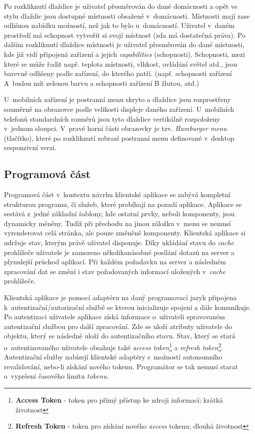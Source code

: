 Po rozkliknutí dlaždice je uživatel přesměrován do dané domácnosti a opět ve stylu dlaždic jsou dostupné místnosti obsažené v~domácnosti.
Místnosti mají zase odlišnou nabídku možností, než jak to bylo u~domácností.
Uživatel v~daném prostředí má schopnost vytvořit si svojí místnost (zda má dostatečná práva).
Po dalším rozkliknutí dlaždice místnosti je uživatel přesměrován do dané místnosti, kde již vidí připojená zařízení a jejich \emph{capabilities} (schopnosti).
Schopnosti, mezi které se může řadit např. teplota místnosti, vlhkost, ovládání světel atd., jsou barevně odlišeny podle zařízení, do kterého patří. (např. schopnosti zařízení A~budou mít zelenou barvu a schopnosti zařízení B žlutou, atd.)

U~mobilních zařízení je postranní menu skryto a dlaždice jsou rozprostřeny souměrně na obrazovce podle velikosti displeje daného zařízení.
U~mobilních telefonů standardních rozměrů jsou tyto dlaždice vertikálně rozpoloženy v~jednom sloupci.
V~pravé horní části obrazovky je tzv. \emph{Hamburger menu} (tlačítko), které po rozkliknutí zobrazí postranní menu definované v~desktop responzivní verzi.

\subsection*{Programová část}
\label{frontend:program}
Programová část v~kontextu návrhu klientské aplikace se zabývá kompletní strukturou programu, či služeb, které probíhají na pozadí aplikace.
Aplikace se sestává z~jedné základní šablony, kde ostatní prvky, neboli komponenty, jsou dynamicky měněny.
Tudíž při přechodu na jinou záložku v~menu se nemusí vyrenderovat celá stránka, ale pouze změněné komponenty.
Klientská aplikace si udržuje stav, kterým právě uživatel disponuje.
Díky ukládání stavu do \emph{cache} prohlížeče uživatele je zamezeno několikanásobné posílání dotazů na server a plynulejší průchod aplikací.
Při každém požadavku na server a následném zpracování dat se změní i stav požadovaných informací uložených v~\emph{cache} prohlížeče.

Klientská aplikace je pomocí adaptéru na daný programovací jazyk připojena k~autentizační/autorizační službě se kterou inicializuje spojení a dále komunikuje.
Po autentizaci uživatele aplikace získá informace o~uživateli spravovaném autentizační službou pro další zpracování.
Zde se uloží atributy uživatele do objektu, který se následně uloží do autentizačního stavu.
Stav, který se stará o~autentizovaného uživatele obsahuje také \emph{access token}\footnote{\textbf{Access Token} - token pro přímý přístup ke zdroji informací; krátká životnost} a \emph{refresh token}\footnote{\textbf{Refresh Token} - token pro získání nového \emph{access} tokenu; dlouhá životnost}.
Autentizační služby nabízejí klientské adaptéry s~možností autonomního revalidování, nebo-li získání nového tokenu.
Programátor se tak nemusí starat o~vypršení časového limitu \emph{tokenu}.


